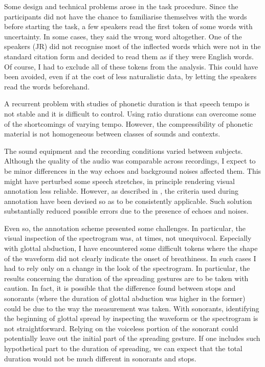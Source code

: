 \documentclass[11pt,a4paper,openany]{memoir}\usepackage[]{graphicx}\usepackage[]{color}
\begin{document}
Some design and technical problems arose in the task procedure.
Since the participants did not have the chance to familiarise themselves with the words before starting the task, a few speakers read the first token of some words with uncertainty.
In some cases, they said the wrong word altogether.
One of the speakers (JR) did not recognise most of the inflected words which were not in the standard citation form and decided to read them as if they were English words.
Of course, I had to exclude all of these tokens from the analysis.
This could have been avoided, even if at the cost of less naturalistic data, by letting the speakers read the words beforehand.

A recurrent problem with studies of phonetic duration is that speech tempo is not stable and it is difficult to control.
Using ratio durations can overcome some of the shortcomings of varying tempo.
However, the compressibility of phonetic material is not homogeneous between classes of sounds and contexts.

The sound equipment and the recording conditions varied between subjects.
Although the quality of the audio was comparable across recordings, I expect to be minor differences in the way echoes and background noises affected them.
This might have perturbed some speech stretches, in principle rendering visual annotation less reliable.
However, as described in , the criteria used during annotation have been devised so as to be consistently applicable.
Such solution substantially reduced possible errors due to the presence of echoes and noises.

Even so, the annotation scheme presented some challenges.
In particular, the visual inspection of the spectrogram was, at times, not unequivocal.
Especially with glottal abduction, I have encountered some difficult tokens where the shape of the waveform did not clearly indicate the onset of breathiness.
In such cases I had to rely only on a change in the look of the spectrogram.
In particular, the results concerning the duration of the spreading gestures are to be taken with caution.
In fact, it is possible that the difference found between stops and sonorants (where the duration of glottal abduction was higher in the former) could be due to the way the measurement was taken.
With sonorants, identifying the beginning of glottal spread by inspecting the waveform or the spectrogram is not straightforward.
Relying on the voiceless portion of the sonorant could potentially leave out the initial part of the spreading gesture.
If one includes such hypothetical part to the duration of spreading, we can expect that the total duration would not be much different in sonorants and stops.
\end{document}
